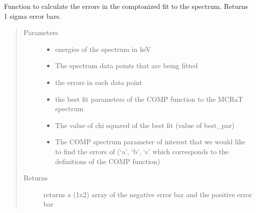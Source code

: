 \documentclass[letterpaper,10pt,english]{sphinxmanual}
\begin{document}
\begin{fulllineitems}
\label{\detokenize{read_process_files:read_process_files.param_err_comp}}
Function to calculate the errors in the comptonized fit to the spectrum. Returns 1 sigma error bars.
\begin{quote}\begin{description}
\item[{Parameters}] \leavevmode\begin{itemize}
\item {} 
 \textendash{} energies of the spectrum in keV

\item {} 
 \textendash{} The spectrum data points that are being fitted

\item {} 
 \textendash{} the errors in each data point

\item {} 
 \textendash{} the best fit parameters of the COMP function to the MCRaT spectrum

\item {} 
 \textendash{} The value of chi squared of the best fit (value of best\_par)

\item {} 
 \textendash{} The COMP spectrum parameter of interest that we would like to find the errors of (‘a’, ‘b’, ‘c’ which
corresponds to the definitions of the COMP function)

\end{itemize}

\item[{Returns}] \leavevmode
returns a (1x2) array of the negative error bar and the positive error bar

\end{description}\end{quote}

\end{fulllineitems}

\end{document}
